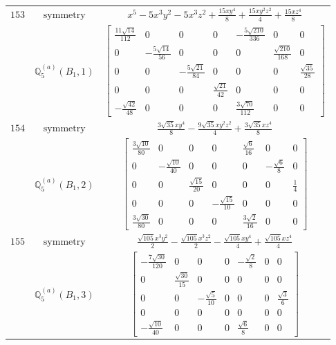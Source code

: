 \documentclass[fleqn,8pt,landscape]{jsarticle}
\begin{document}
\begin{longtable}{ccc}
$ 153 $ & $ \text{symmetry} $ & $ x^{5} - 5 x^{3} y^{2} - 5 x^{3} z^{2} + \frac{15 x y^{4}}{8} + \frac{15 x y^{2} z^{2}}{4} + \frac{15 x z^{4}}{8} $ \\
$  $ & $ \mathbb{Q}_{5}^{(a)}(B_{1},1) $ & $ \begin{bmatrix} \frac{11 \sqrt{14}}{112} & 0 & 0 & 0 & - \frac{5 \sqrt{210}}{336} & 0 & 0 \\ 0 & - \frac{5 \sqrt{14}}{56} & 0 & 0 & 0 & \frac{\sqrt{210}}{168} & 0 \\ 0 & 0 & - \frac{5 \sqrt{21}}{84} & 0 & 0 & 0 & \frac{\sqrt{35}}{28} \\ 0 & 0 & 0 & \frac{\sqrt{21}}{42} & 0 & 0 & 0 \\ - \frac{\sqrt{42}}{48} & 0 & 0 & 0 & \frac{3 \sqrt{70}}{112} & 0 & 0 \end{bmatrix} $ \\ \hline
$ 154 $ & $ \text{symmetry} $ & $ \frac{3 \sqrt{35} x y^{4}}{8} - \frac{9 \sqrt{35} x y^{2} z^{2}}{4} + \frac{3 \sqrt{35} x z^{4}}{8} $ \\
$  $ & $ \mathbb{Q}_{5}^{(a)}(B_{1},2) $ & $ \begin{bmatrix} \frac{3 \sqrt{10}}{80} & 0 & 0 & 0 & \frac{\sqrt{6}}{16} & 0 & 0 \\ 0 & - \frac{\sqrt{10}}{40} & 0 & 0 & 0 & - \frac{\sqrt{6}}{8} & 0 \\ 0 & 0 & \frac{\sqrt{15}}{20} & 0 & 0 & 0 & \frac{1}{4} \\ 0 & 0 & 0 & - \frac{\sqrt{15}}{10} & 0 & 0 & 0 \\ \frac{3 \sqrt{30}}{80} & 0 & 0 & 0 & \frac{3 \sqrt{2}}{16} & 0 & 0 \end{bmatrix} $ \\ \hline
$ 155 $ & $ \text{symmetry} $ & $ \frac{\sqrt{105} x^{3} y^{2}}{2} - \frac{\sqrt{105} x^{3} z^{2}}{2} - \frac{\sqrt{105} x y^{4}}{4} + \frac{\sqrt{105} x z^{4}}{4} $ \\
$  $ & $ \mathbb{Q}_{5}^{(a)}(B_{1},3) $ & $ \begin{bmatrix} - \frac{7 \sqrt{30}}{120} & 0 & 0 & 0 & - \frac{\sqrt{2}}{8} & 0 & 0 \\ 0 & \frac{\sqrt{30}}{15} & 0 & 0 & 0 & 0 & 0 \\ 0 & 0 & - \frac{\sqrt{5}}{10} & 0 & 0 & 0 & \frac{\sqrt{3}}{6} \\ 0 & 0 & 0 & 0 & 0 & 0 & 0 \\ - \frac{\sqrt{10}}{40} & 0 & 0 & 0 & \frac{\sqrt{6}}{8} & 0 & 0 \end{bmatrix} $ \\ \hline

\end{longtable}
\end{document}
